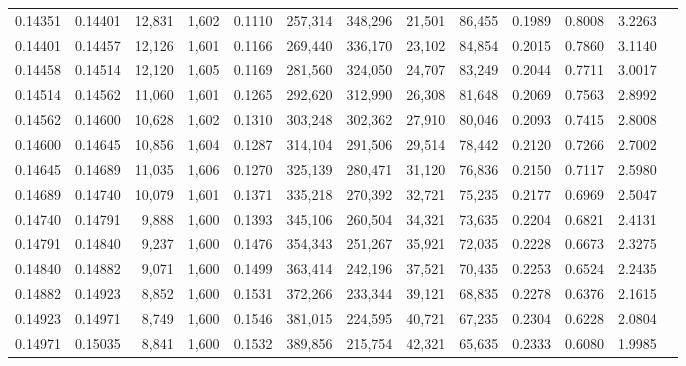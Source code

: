 \begin{tabular}{rrrrrrrrrrrrr}
0.14351 & 0.14401 & 12,831 & 1,602 &                                     0.1110 & 257,314 & 348,296 &  21,501 &  86,455 & 0.1989 & 0.8008 & 3.2263 \\
0.14401 & 0.14457 & 12,126 & 1,601 &                                     0.1166 & 269,440 & 336,170 &  23,102 &  84,854 & 0.2015 & 0.7860 & 3.1140 \\
0.14458 & 0.14514 & 12,120 & 1,605 &                                     0.1169 & 281,560 & 324,050 &  24,707 &  83,249 & 0.2044 & 0.7711 & 3.0017 \\
0.14514 & 0.14562 & 11,060 & 1,601 &                                     0.1265 & 292,620 & 312,990 &  26,308 &  81,648 & 0.2069 & 0.7563 & 2.8992 \\
0.14562 & 0.14600 & 10,628 & 1,602 &                                     0.1310 & 303,248 & 302,362 &  27,910 &  80,046 & 0.2093 & 0.7415 & 2.8008 \\
0.14600 & 0.14645 & 10,856 & 1,604 &                                     0.1287 & 314,104 & 291,506 &  29,514 &  78,442 & 0.2120 & 0.7266 & 2.7002 \\
0.14645 & 0.14689 & 11,035 & 1,606 &                                     0.1270 & 325,139 & 280,471 &  31,120 &  76,836 & 0.2150 & 0.7117 & 2.5980 \\
0.14689 & 0.14740 & 10,079 & 1,601 &                                     0.1371 & 335,218 & 270,392 &  32,721 &  75,235 & 0.2177 & 0.6969 & 2.5047 \\
0.14740 & 0.14791 &  9,888 & 1,600 &                                     0.1393 & 345,106 & 260,504 &  34,321 &  73,635 & 0.2204 & 0.6821 & 2.4131 \\
0.14791 & 0.14840 &  9,237 & 1,600 &                                     0.1476 & 354,343 & 251,267 &  35,921 &  72,035 & 0.2228 & 0.6673 & 2.3275 \\
0.14840 & 0.14882 &  9,071 & 1,600 &                                     0.1499 & 363,414 & 242,196 &  37,521 &  70,435 & 0.2253 & 0.6524 & 2.2435 \\
0.14882 & 0.14923 &  8,852 & 1,600 &                                     0.1531 & 372,266 & 233,344 &  39,121 &  68,835 & 0.2278 & 0.6376 & 2.1615 \\
0.14923 & 0.14971 &  8,749 & 1,600 &                                     0.1546 & 381,015 & 224,595 &  40,721 &  67,235 & 0.2304 & 0.6228 & 2.0804 \\
0.14971 & 0.15035 &  8,841 & 1,600 &                                     0.1532 & 389,856 & 215,754 &  42,321 &  65,635 & 0.2333 & 0.6080 & 1.9985 \\

\end{tabular}
